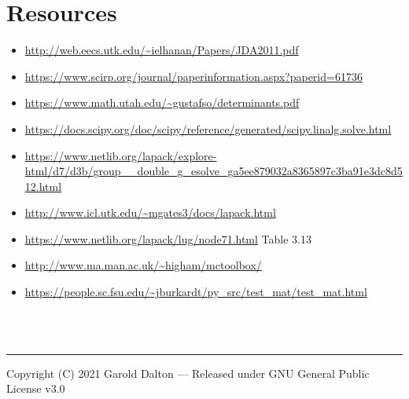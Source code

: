 \documentclass[12pt]{article}
\begin{document}
\section*{Resources}
\begin{itemize}
	\item \url{http://web.eecs.utk.edu/~ielhanan/Papers/JDA2011.pdf}
	\item \url{https://www.scirp.org/journal/paperinformation.aspx?paperid=61736}
	\item \url{https://www.math.utah.edu/~gustafso/determinants.pdf}
	\item \url{https://docs.scipy.org/doc/scipy/reference/generated/scipy.linalg.solve.html}
	\item \url{https://www.netlib.org/lapack/explore-html/d7/d3b/group__double_g_esolve_ga5ee879032a8365897c3ba91e3dc8d512.html}
	\item \url{http://www.icl.utk.edu/~mgates3/docs/lapack.html}
	\item \url{https://www.netlib.org/lapack/lug/node71.html} Table 3.13
	\item \url{http://www.ma.man.ac.uk/~higham/mctoolbox/}
	\item \url{https://people.sc.fsu.edu/~jburkardt/py_src/test_mat/test_mat.html}
\end{itemize}

\begin{align*}
\end{align*}

\begin{align*}
\end{align*}

\begin{lstlisting}[language=Python]
\end{lstlisting}

\noindent\rule{\textwidth}{1pt}
{\footnotesize Copyright (C) 2021 Garold Dalton --- Released under GNU General Public License v3.0}

\cleardoublepage
\end{document}

